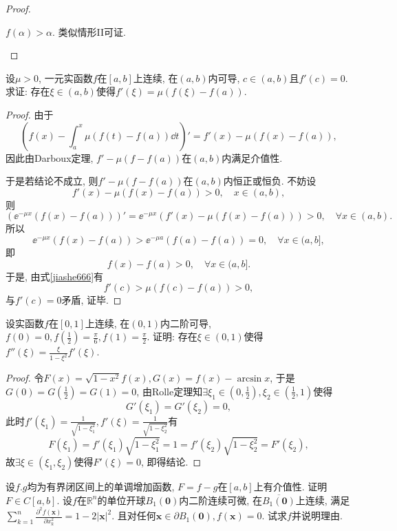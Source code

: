 \begin{quiza}
\begin{proof}
\begin{asparaenum}[\textbf{情形}I]
\item \(f(\alpha)>\alpha\). 类似情形II可证.\qedhere
\end{asparaenum}
\end{proof}
\woe 设\(\mu>0\), 一元实函数\(f\)在\([a,b]\)上连续, 在\((a,b)\)内可导, \(c\in(a,b)\)且\(f'(c)=0\). 求证: 存在\(\xi\in(a,b)\)使得\(f'(\xi)=\mu\left(f(\xi)-f(a)\right)\).
\begin{proof}
由于\[\left(f(x)-\int_{a}^{x}\mu\left(f(t)-f(a)\right)\dd t\right)'=f'(x)-\mu\left(f(x)-f(a)\right),\]因此由Darboux定理, \(f'-\mu\left(f-f(a)\right)\)在\((a,b)\)内满足介值性. 

于是若结论不成立, 则\(f'-\mu\left(f-f(a)\right)\)在\((a,b)\)内恒正或恒负. 不妨设
\begin{equation}\label{jiashe666}
f'(x)-\mu\left(f(x)-f(a)\right)>0,\quad x\in(a,b),\tag{$\circledast$}
\end{equation}
则\[\left(\ee^{-\mu x}\left(f(x)-f(a)\right)\right)'=\ee^{-\mu x}\left(f'(x)-\mu\left(f(x)-f(a)\right)\right)>0,\quad\forall x\in(a,b).\]所以\[\ee^{-\mu x}\left(f(x)-f(a)\right)>\ee^{-\mu a}\left(f(a)-f(a)\right)=0,\quad\forall x\in(a,b],\]即\[f(x)-f(a)>0,\quad\forall x\in(a,b].\]于是, 由式\eqref{jiashe666}有\[f'(c)>\mu\left(f(c)-f(a)\right)>0,\]与\(f'(c)=0\)矛盾, 证毕.
\end{proof}
\woe 设实函数\(f\)在\([0,1]\)上连续, 在\((0,1)\)内二阶可导, \(f(0)=0,f\left(\frac{1}{2}\right)=\frac{\pi}{6},f(1)=\frac{\pi}{2}\). 证明: 存在\(\xi\in(0,1)\)使得\(f''(\xi)=\frac{\xi}{1-\xi^2}f'(\xi)\).
\begin{proof}
令\(F(x)=\sqrt{1-x^2}f(x),G(x)=f(x)-\arcsin x\), 于是\(G(0)=G\left(\frac{1}{2}\right)=G(1)=0\), 由Rolle定理知\(\exists \xi_1\in\left(0,\frac{1}{2}\right),\xi_2\in\left(\frac{1}{2},1\right)\)使得\[G'(\xi_1)=G'(\xi_2)=0,\]此时\(f'(\xi_1)=\frac{1}{\sqrt{1-\xi_1^2}},f'(\xi)=\frac{1}{\sqrt{1-\xi_2^2}}\)有\[F(\xi_1)=f'(\xi_1)\sqrt{1-\xi_1^2}=1=f'(\xi_2)\sqrt{1-\xi_2^2}=F'(\xi_2),\]故\(\exists \xi\in\left(\xi_1,\xi_2\right)\)使得\(F'(\xi)=0\), 即得结论.
\end{proof}

\woe 设\(f.g\)均为有界闭区间上的单调增加函数, \(F=f-g\)在\([a,b]\)上有介值性. 证明\(F\in C[a,b]\).
\woe 设\(f\)在\(\mathbb{R}^n\)的单位开球\(B_1(\boldsymbol{0})\)内二阶连续可微, 在\(\overline{B_1(\boldsymbol{0})}\)上连续, 满足\(\sum_{k=1}^{n}\frac{\partial^2f(\boldsymbol{x})}{\partial x_k^2}=1-2|\boldsymbol{x}|^2\). 且对任何\(\boldsymbol{x}\in\partial B_1(\boldsymbol{0}),f(\boldsymbol{x})=0\). 试求\(f\)并说明理由.
\end{quiza}

